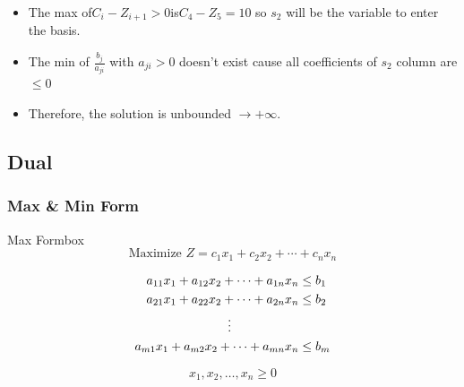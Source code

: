 \vspace{0.25cm}
\begin{itemize}   
\item The max of\hspace{0.2cm}\(C_i - Z_{i+1} > 0\)\hspace{0.2cm}is\hspace{0.2cm}\(C_4 - Z_5 = 10\)\hspace{0.1cm} so \(s_2\) 
will be the variable to enter the basis.
\item The min of \hspace{0.1cm}\(\frac{b_j}{a_{ji}}\)\hspace{0.1cm} with \(a_{ji} > 0\)\hspace{0.1cm} doesn't exist cause all coefficients of \(s_2\) column are \(\leq 0\) 
\item Therefore, the solution is unbounded \(\to +\infty\).
 
\end{itemize}

\newpage

\subsection{Dual}

\subsubsection{Max \& Min Form}

\begin{prettyBox}{Max Form}{box}
 \[
    \text{Maximize } Z = c_1x_1 + c_2x_2 + \cdots + c_nx_n
\]

\vspace{0.25cm}
\hspace{1cm}
\[
\begin{aligned}
    a_{11}x_1 + a_{12}x_2 + \cdots + a_{1n}x_n &\leq b_1 \\
    a_{21}x_1 + a_{22}x_2 + \cdots + a_{2n}x_n &\leq b_2 \\
    &\hspace{-2cm}\vdots \\
    a_{m1}x_1 + a_{m2}x_2 + \cdots + a_{mn}x_n &\leq b_m
\end{aligned}
\]

\[
    x_1, x_2, \dots, x_n \geq 0  
\]
   
\end{prettyBox}

\vspace{0.85cm}


